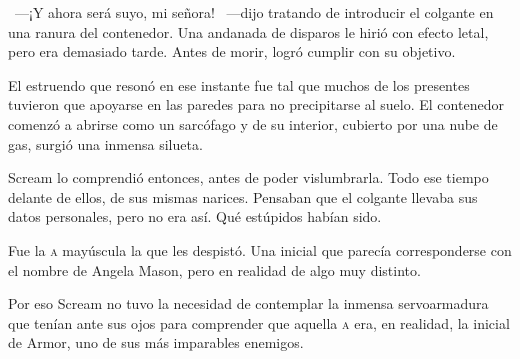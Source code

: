 ~---¡Y ahora será suyo, mi señora! ~---dijo tratando de introducir el colgante en una ranura del contenedor. Una andanada de disparos le hirió con efecto letal, pero era demasiado tarde. Antes de morir, logró cumplir con su objetivo.

El estruendo que resonó en ese instante fue tal que muchos de los presentes tuvieron que apoyarse en las paredes para no precipitarse al suelo. El contenedor comenzó a abrirse como un sarcófago y de su interior, cubierto por una nube de gas, surgió una inmensa silueta.

Scream lo comprendió entonces, antes de poder vislumbrarla. Todo ese tiempo delante de ellos, de sus mismas narices. Pensaban que el colgante llevaba sus datos personales, pero no era así. Qué estúpidos habían sido.

Fue la \textsc{a} mayúscula la que les despistó. Una inicial que parecía corresponderse con el nombre de Angela Mason, pero en realidad de algo muy distinto.

Por eso Scream no tuvo la necesidad de contemplar la inmensa servoarmadura que tenían ante sus ojos para comprender que aquella \textsc{a} era, en realidad, la inicial de Armor, uno de sus más imparables enemigos.

\endinput
